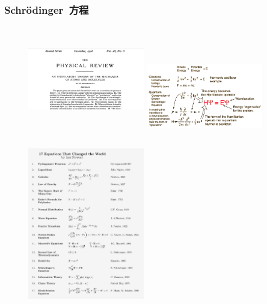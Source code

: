 \frame
{
	\frametitle{\textrm{Schr\"odinger}~方程}
\begin{minipage}{0.49\textwidth}
\begin{figure}[h!]
\centering
%
\vspace{-25.5pt}
\includegraphics[height=1.80in,width=2.00in,viewport=180 0 1380 1100,clip]{Figures/Schrodinger_article.png}
\includegraphics[height=1.20in,width=2.00in,viewport=0 0 600 350,clip]{Figures/Schrodinger_Equation.png}
\label{Schrodinger_Equation}
\end{figure}
\end{minipage}
\begin{minipage}{0.49\textwidth}
\begin{figure}[h!]
\centering
%
\vspace{-15.5pt}
\includegraphics[height=2.85in,width=2.00in,viewport=0 0 780 1100,clip]{Figures/Great_Equation.jpg}
\label{Great_Equation}
\end{figure}
\end{minipage}
}

